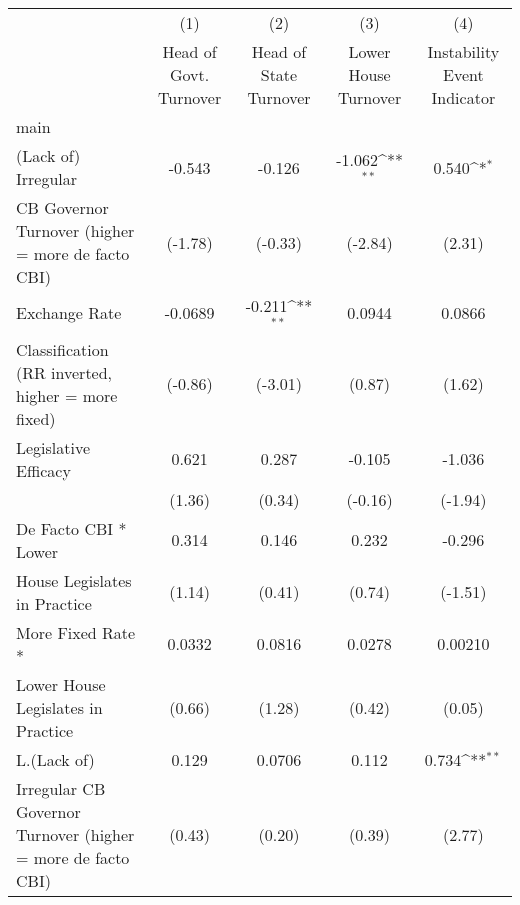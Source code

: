 {
\def\sym#1{\ifmmode^{#1}\else\(^{#1}\)\fi}
\begin{tabular}{l*{4}{c}}
\hline\hline
                    &\multicolumn{1}{c}{(1)}&\multicolumn{1}{c}{(2)}&\multicolumn{1}{c}{(3)}&\multicolumn{1}{c}{(4)}\\
                    &\multicolumn{1}{c}{Head of Govt. Turnover}&\multicolumn{1}{c}{Head of State Turnover}&\multicolumn{1}{c}{Lower House Turnover}&\multicolumn{1}{c}{Instability Event Indicator}\\
\hline
main                &                     &                     &                     &                     \\
(Lack of) Irregular &      -0.543         &      -0.126         &      -1.062\sym{**} &       0.540\sym{*}  \\
CB Governor Turnover (higher = more de facto CBI)&     (-1.78)         &     (-0.33)         &     (-2.84)         &      (2.31)         \\
[1em]
Exchange Rate       &     -0.0689         &      -0.211\sym{**} &      0.0944         &      0.0866         \\
Classification (RR inverted, higher = more fixed)&     (-0.86)         &     (-3.01)         &      (0.87)         &      (1.62)         \\
[1em]
Legislative Efficacy&       0.621         &       0.287         &      -0.105         &      -1.036         \\
                    &      (1.36)         &      (0.34)         &     (-0.16)         &     (-1.94)         \\
[1em]
De Facto CBI * Lower&       0.314         &       0.146         &       0.232         &      -0.296         \\
House Legislates in Practice&      (1.14)         &      (0.41)         &      (0.74)         &     (-1.51)         \\
[1em]
More Fixed Rate *   &      0.0332         &      0.0816         &      0.0278         &     0.00210         \\
Lower House Legislates in Practice&      (0.66)         &      (1.28)         &      (0.42)         &      (0.05)         \\
[1em]
L.(Lack of)         &       0.129         &      0.0706         &       0.112         &       0.734\sym{**} \\
Irregular CB Governor Turnover (higher = more de facto CBI)&      (0.43)         &      (0.20)         &      (0.39)         &      (2.77)         \\

\end{tabular}}
